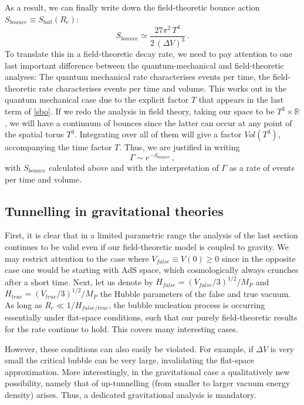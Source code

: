 \documentclass[12pt]{article}
\newcommand{\be}{\begin{equation}}
\newcommand{\ee}{\end{equation}}
\numberwithin{equation}{section}
\begin{document}
As a result, we can finally write down the field-theoretic bounce action $S_{bounce}\equiv S_{ball}(R_c)$:
\be
S_{bounce}\simeq \frac{27\pi^2\,T^4}{2\,(\Delta V)^3}\,.
\label{ftb}
\ee
To translate this in a field-theoretic decay rate, we need to pay attention to one last important difference between the quantum-mechanical and field-theoretic analyses: The quantum mechanical rate characterises events per time, the field-theoretic rate characterises events per time and volume. This works out in the quantum mechanical case due to the explicit factor $T$ that appears in the last term of \eqref{sbo}. If we redo the analysis in field theory, taking our space to be $T^3\times \mathbb{R}$, we will have a continuum of bounces since the latter can occur at any point of the spatial torus $T^3$. Integrating over all of them will give a factor $V\!ol(T^3)$, accompanying the time factor $T$. Thus, we are justified in writing 
\be
\Gamma\sim e^{-S_{bounce}}\,,
\ee
with $S_{bounce}$ calculated above and with the interpretation of $\Gamma$ as a rate of events per time and volume. 




\subsection{Tunnelling in gravitational theories}\label{cdls}
First, it is clear that in a limited parametric range the analysis of the last section continues to be valid even if our field-theoretic model is coupled to gravity. We may restrict attention to the case where $V_{false}\equiv V(0)\ge 0$ since in the opposite case one would be starting with AdS space, which cosmologically always crunches after a short time. Next, let us denote by $H_{false}=(V_{false}/3)^{1/2}/M_P$ and $H_{true}=(V_{true}/3)^{1/2}/M_P$ the Hubble parameters of the false and true vacuum. As long as $R_c\ll 1/H_{false/true}$, the bubble nucleation process is occurring essentially under flat-space conditions, such that our purely field-theoretic results for the rate continue to hold. This covers many interesting cases.

However, these conditions can also easily be violated. For example, if $\Delta V$ is very small the critical bubble can be very large, invalidating the flat-space approximation. More interestingly, in the gravitational case a qualitatively new possibility, namely that of up-tunnelling (from smaller to larger vacuum energy density) arises. Thus, a dedicated gravitational analysis is mandatory.
\end{document}
